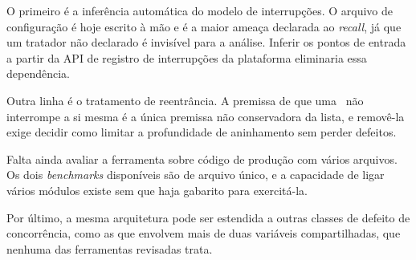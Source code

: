 O primeiro é a inferência automática do modelo de interrupções. O arquivo de
configuração é hoje escrito à mão e é a maior ameaça declarada ao \textit{recall}, já
que um tratador não declarado é invisível para a análise. Inferir os pontos de
entrada a partir da API de registro de interrupções da plataforma eliminaria
essa dependência.

Outra linha é o tratamento de reentrância. A premissa de que uma \isr\ não
interrompe a si mesma é a única premissa não conservadora da lista, e removê-la
exige decidir como limitar a profundidade de aninhamento sem perder defeitos.

Falta ainda avaliar a ferramenta sobre código de produção com vários arquivos. Os dois
\textit{benchmarks} disponíveis são de arquivo único, e a capacidade de ligar
vários módulos existe sem que haja gabarito para exercitá-la.

Por último, a mesma arquitetura pode ser estendida a outras classes de
defeito de concorrência, como as que envolvem mais de duas variáveis compartilhadas, que
nenhuma das ferramentas revisadas trata.
